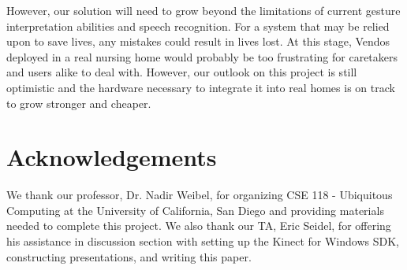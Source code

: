 \documentclass{chi-ext}
\begin{document}
However, our solution will need to grow beyond the limitations of current gesture interpretation abilities and speech recognition.
For a system that may be relied upon to save lives, any mistakes could result in lives lost.
At this stage, Vendos deployed in a real nursing home would probably be too frustrating for caretakers and users alike to deal with.
However, our outlook on this project is still optimistic and the hardware necessary to integrate it into real homes is on track to grow stronger and cheaper.

\section{Acknowledgements}

We thank our professor, Dr. Nadir Weibel, for organizing CSE 118 - Ubiquitous Computing at the University of California, San Diego and providing materials needed to complete this project.
We also thank our TA, Eric Seidel, for offering his assistance in discussion section with setting up the Kinect for Windows SDK, constructing presentations, and writing this paper.

\balance


\end{document}
